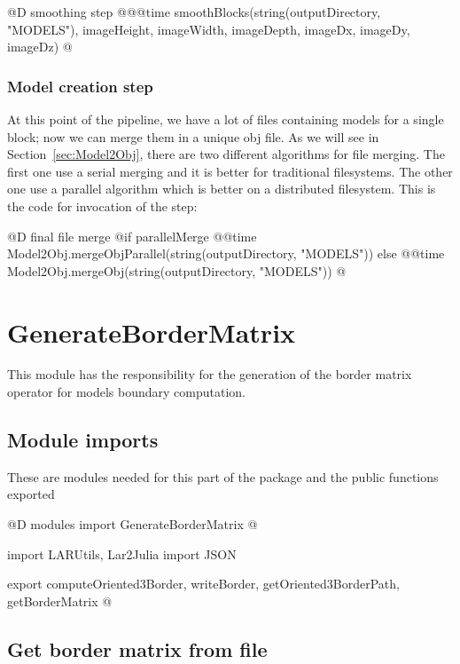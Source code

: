 \documentclass[11pt,oneside]{article}	%
\begin{document}
@D smoothing step
@{@@time smoothBlocks(string(outputDirectory, "MODELS"),
	      imageHeight, imageWidth, imageDepth,
	      imageDx, imageDy, imageDz) @}
                      
\subsubsection{Model creation step}\label{sec:mergeStep}

At this point of the pipeline, we have a lot of files containing models for a single block; now we can merge them in a unique obj file. As we will see in Section~\ref{sec:Model2Obj}, there are two different algorithms for file merging. The first one use a serial merging and it is better for traditional filesystems. The other one use a parallel algorithm which 
is better on a distributed filesystem. This is the code for invocation of the step:

@D final file merge
@{if parallelMerge
  @@time Model2Obj.mergeObjParallel(string(outputDirectory, "MODELS"))
else
  @@time Model2Obj.mergeObj(string(outputDirectory, "MODELS")) @}

\section{GenerateBorderMatrix}\label{sec:GenerateBorderMatrix}
This module has the responsibility for the generation of the border matrix operator for models boundary computation.

\subsection{Module imports}\label{sec:importsBorderMatrix}

These are modules needed for this part of the package and the public functions exported

@D modules import GenerateBorderMatrix
@{import LARUtils, Lar2Julia
import JSON

export computeOriented3Border, writeBorder, getOriented3BorderPath, getBorderMatrix
@}

\subsection{Get border matrix from file}\label{sec:getBorderMatrix}
\end{document}
